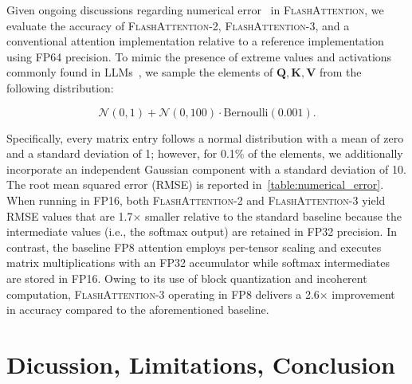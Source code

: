 \begin{enumerate}
\begin{itemize}
Given ongoing discussions regarding numerical error~\citep{golden2024flash} in
\textsc{FlashAttention}, we evaluate the accuracy of \textsc{FlashAttention-2}, \textsc{FlashAttention-3}, and a conventional attention implementation relative to a reference implementation using FP64 precision. To mimic the presence of extreme values and activations commonly found in LLMs~\citep{dettmers2208llm,
  sun2024massive}, we sample the elements of $\mathbf{Q}, \mathbf{K}, \mathbf{V}$ from the following distribution:

\begin{equation*}
  \mathcal{N}(0, 1) + \mathcal{N}(0, 100) \cdot \mathrm{Bernoulli}(0.001).
\end{equation*}

Specifically, every matrix entry follows a normal distribution with a mean of zero and a standard deviation of 1; however, for 0.1\% of the elements, we additionally incorporate an independent Gaussian component with a standard deviation of 10. The root mean squared error (RMSE) is reported in~\cref{table:numerical_error}. When running in FP16, both \textsc{FlashAttention-2} and \textsc{FlashAttention-3} yield RMSE values that are 1.7$\times$ smaller relative to the standard baseline because the intermediate values (i.e., the softmax output) are retained in FP32 precision. In contrast, the baseline FP8 attention employs per-tensor scaling and executes matrix multiplications with an FP32 accumulator while softmax intermediates are stored in FP16. Owing to its use of block quantization and incoherent computation, \textsc{FlashAttention-3} operating in FP8 delivers a 2.6$\times$ improvement in accuracy compared to the aforementioned baseline.

\section{Dicussion, Limitations, Conclusion}
\label{sec:discussion}


\end{itemize}
\end{enumerate}
